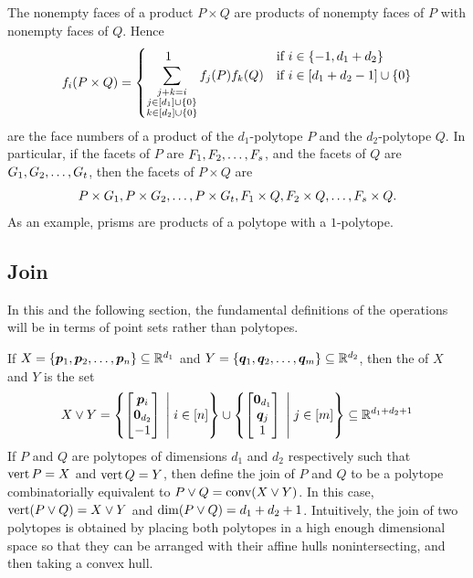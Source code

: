        The nonempty faces of a product \(P\times Q\) are products of nonempty faces of \(P\) with nonempty faces of \(Q\). Hence
            \[
                f_i(P\times Q)
                    =   \begin{cases}
                            \phantom{poo}1                               &\text{if }i\in\left\{-1,d_1+d_2\right\}\\
                            \displaystyle\sum_{\substack{j+k=i\\ j\in\left[d_1\right]\cup\left\{0\right\}\\ k\in\left[d_2\right]\cup\left\{0\right\}}}f_j(P)f_k(Q)     &\text{if }i\in\left[d_1+d_2-1\right]\cup\left\{0\right\}
                        \end{cases}
            \]
        are the face numbers of a product of the \(d_1\)-polytope \(P\) and the \(d_2\)-polytope \(Q\).  In particular, if the facets of \(P\) are \(F_1,F_2,\dotsc, F_s\), and the facets of \(Q\) are \(G_1,G_2,\dotsc, G_t\), then the facets of \(P\times Q\) are
            \[
                P\times G_1,P\times G_2,\dotsc, P\times G_t,F_1\times Q,F_2\times Q,\dotsc, F_s\times Q.
            \]
        As an example, prisms are products of a polytope with a \(1\)-polytope.
    \subsection{Join}\label{SSec:Join}
        In this and the following section, the fundamental definitions of the operations will be in terms of point sets rather than polytopes.

        If  \(X=\left\{\bm{p}_1,\bm{p}_2,\dotsc,\bm{p}_n\right\}\subseteq\mathbb{R}^{d_1}\) and \(Y=\left\{\bm{q}_1,\bm{q}_2,\dotsc,\bm{q}_m\right\}\subseteq\mathbb{R}^{d_2}\), then the  of \(X\) and \(Y\) is the set
            \[
                X\join Y
                    =
                        \setb{\begin{bmatrix}\ve p_i\\\ve0_{d_2}\\-1\end{bmatrix}}{i\in\brac n}
                        \cup
                        \setb{\begin{bmatrix}\ve 0_{d_1}\\\ve q_j\\1\end{bmatrix}}{j\in\brac m}
                    \sbset
                        \R{d_1+d_2+1}
            \]
        If \(P\) and \(Q\) are polytopes of dimensions \(d_1\) and \(d_2\) respectively such that \(\operatorname{vert} P=X\) and \(\operatorname{vert} Q=Y\), then define the join of \(P\) and \(Q\) to be a polytope combinatorially equivalent to \(P\vee Q=\operatorname{conv}(X\vee Y)\).  In this case, \(\operatorname{vert}(P\vee Q)=X\vee Y\) and \(\dim(P\vee Q)=d_1+d_2+1\).  Intuitively, the join of two polytopes is obtained by placing both polytopes in a high enough dimensional space so that they can be arranged with their affine hulls nonintersecting, and then taking a convex hull.

